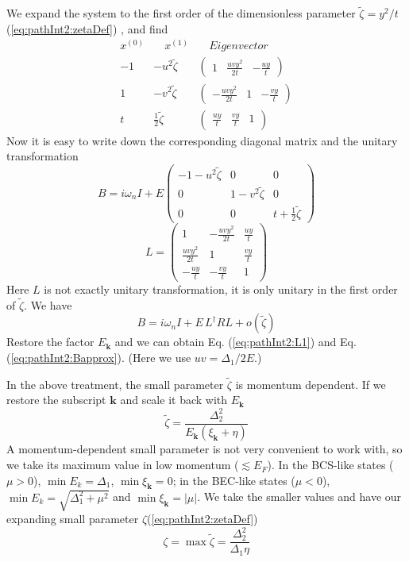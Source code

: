 \documentclass[reprint,pra]{revtex4-1}
\newcommand{\vk}{\ensuremath{\mathbf{k}}}
\newcommand{\nth}[1]{\ensuremath{\frac{1}{#1}}}
\providecommand{\abs}[1]{\ensuremath{\left\lvert{#1}\right\rvert}}
\newcommand{\mtrx}[1]{\ensuremath{\begin{pmatrix}#1\end{pmatrix}}}
\newcommand{\dg}{\ensuremath{\dagger}}
\begin{document}
We expand the system to the first order of the dimensionless parameter $\tilde\zeta=y^{2}/{t}$ (\ref{eq:pathInt2:zetaDef})%
, and find
\begin{equation}
\begin{array}{ccc}
x^{(0)}&\quad{}x^{(1)}&\quad{}Eigenvector\nonumber\\
-1&-u^{2}\tilde\zeta&\mtrx{1&\frac{uvy^{2}}{2t}&-\frac{uy}{t}}\\
1&-v^{2}\tilde\zeta&\mtrx{-\frac{uvy^{2}}{2t}&1&-\frac{vy}{t}}\\
t&\nth2\tilde\zeta&\mtrx{\frac{uy}{t}&\frac{vy}{t}&1}
\end{array}
\end{equation}
Now it is easy to write down the corresponding diagonal matrix and the unitary transformation
\begin{equation}
B=i\omega_{n}I+E\mtrx{-1-u^{2}\tilde\zeta&0&0\\0&1-v^{2}\tilde\zeta&0\\0&0&t+\nth2\tilde\zeta}
\end{equation}
\begin{equation}
L=\mtrx{1&-\frac{uvy^{2}}{2t}&\frac{uy}{t}\\\frac{uvy^{2}}{2t}&1&\frac{vy}{t}\\-\frac{uy}{t}&-\frac{vy}{t}&1}
\end{equation}
Here $L$ is not exactly unitary transformation, it is only unitary in the first order of  $\tilde\zeta$. We have 
\[
B=i\omega_{n}I+E\,L^{\dg}RL+o(\tilde\zeta)
\]
Restore the factor $E_{\vk}$ and we can obtain Eq. (\ref{eq:pathInt2:L1}) and Eq. (\ref{eq:pathInt2:Bapprox}).
(Here we use $uv=\Delta_{1}/2E$.)

In the above treatment, the small parameter $\tilde\zeta$ is momentum dependent.  If we restore the subscript $\vk$ and scale it  back with $E_{\vk}$
\begin{equation}
\tilde\zeta=\frac{\Delta_{2}^{2}}{E_{\vk}(\xi_{\vk}+\eta)}
\end{equation}
A momentum-dependent small parameter is not very convenient to work with, so we take its maximum value in low momentum ($\lesssim{}E_{F}$).  In the BCS-like states ($\mu>0$), $\min{E_{k}}=\Delta_{1}$, $\min{\xi_{\vk}}=0$; in the BEC-like states ($\mu<0$), $\min{E_{k}}=\sqrt{\Delta_{1}^{2}+\mu^{2}}$ and $\min{\xi_{\vk}}=\abs{\mu}$. We take the smaller values and have our expanding small parameter $\zeta$(\ref{eq:pathInt2:zetaDef})
\begin{equation}
\zeta=\max\tilde{\zeta}=\frac{\Delta_{2}^{2}}{\Delta_{1}\eta}
\end{equation}
\end{document}
